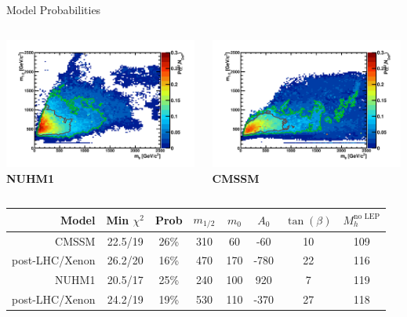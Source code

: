 \documentclass{beamer}
\begin{document}
\begin{frame}{Model Probabilities}
  \begin{columns}
    \begin{column}{0.5\textwidth}
      \includegraphics[height=4.3cm]{prob-2010/nuhm1.pdf}\\
      \textbf{NUHM1}
    \end{column}
    \begin{column}{0.5\textwidth}
      \includegraphics[height=4.3cm]{prob-2010/cmssm.pdf}\\
      \textbf{CMSSM}
    \end{column}
  \end{columns}
  \setlength{\tabcolsep}{5pt}
  \begin{center}
    \tiny
    \begin{tabular}{|r||c|c|c|c|c|c||c|}
      \hline
      Model & Min $\chi^{2}$ & Prob & $m_{1/2}$ & $m_{0}$ & $A_{0}$ &
      $\tan\left(\beta\right)$ & $M_{h}^{\textrm{no LEP}}$  \\
      \hline\hline
      \alert{CMSSM} & 22.5/19 & 26\% & 310 & 60 & -60 & 10 & 109 \\
       post-LHC/Xenon & 26.2/20 & 16\% & 470 & 170 & -780 & 22 & 116 \\
      \hline  
      \alert{NUHM1} & 20.5/17 & 25\% & 240 & 100 & 920 & 7 & 119 \\
       post-LHC/Xenon & 24.2/19 & 19\% & 530 & 110 & -370 & 27 & 118 \\
      \hline
     
    \end{tabular}
  \end{center}
\end{frame}
\end{document}
